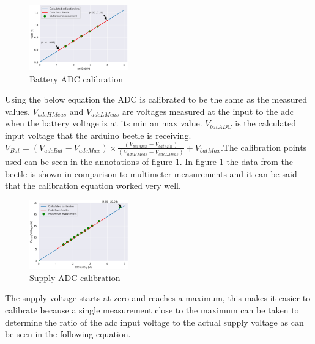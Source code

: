 \begin{figure}
	\begin{center}
		\includegraphics[width=0.38\textwidth]{./Figures/A8/batteryA8.png}
	\end{center}
	\caption{Battery ADC calibration}
	\label{fig:A8bat}
\end{figure}
Using the below equation the ADC is calibrated to be the same as the measured values. $V_{adcHMeas}$ and $V_{adcLMeas}$ are voltages measured at the input to the adc when the battery voltage is at its min an max value. $V_{batADC}$ is the calculated input voltage that the arduino beetle is receiving.\newline
$V_{Bat}=(V_{adcBat}-V_{adcMax})\times \frac{(V_{batMax}-V_{batMin})}{(V_{adcHMeas}-V_{adcLMeas})}+V_{batMax}$.The calibration points used can be seen in the annotations of figure \ref{fig:A8bat}. In figure \ref{fig:A8bat} the data from the beetle is shown in comparison to multimeter measurements and it can be said that the calibration equation worked very well.



\begin{figure}
	\begin{center}
		\includegraphics[width=0.38\textwidth]{./Figures/A8/supplyA8.png}
	\end{center}
	\caption{Supply ADC calibration}
	\label{fig:A8sup}
\end{figure}

The supply voltage starts at zero and reaches a maximum, this makes it easier to calibrate because a single measurement close to the maximum can be taken to determine the ratio of the adc input voltage to the actual supply voltage as can be seen in the following equation.

